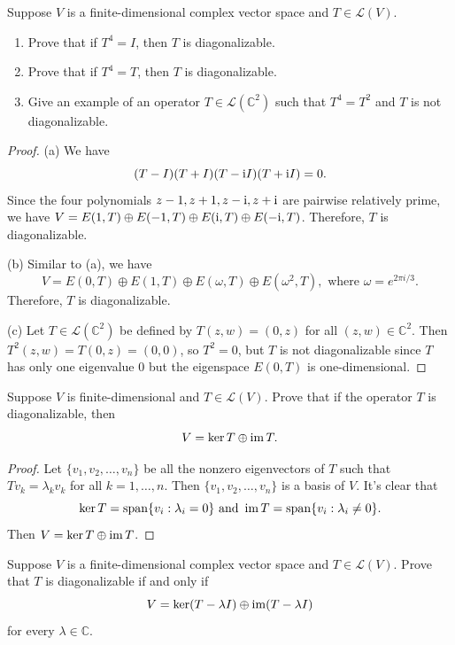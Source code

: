 \documentclass{article}
\begin{document}
\begin{problem}[5D-1]
Suppose $V$ is a finite-dimensional complex vector space and $T \in \mathcal{L}(V)$.
\begin{enumerate}[label=(\alph*)]
\item Prove that if $T^4 = I$, then $T$ is diagonalizable.
\item Prove that if $T^4 = T$, then $T$ is diagonalizable.
\item Give an example of an operator $T \in \mathcal{L}(\mathbb{C}^2)$ such that $T^4 = T^2$ and $T$ is not diagonalizable.
\end{enumerate}
\end{problem}

\begin{proof}
  (a) We have
  \[ (T-I)(T+I)(T-\mathrm{i} I)(T+\mathrm{i} I)=0. \]
  Since the four polynomials \( z-1,z+1,z-\mathrm{i},z+\mathrm{i} \) are pairwise relatively prime, we have \( V = E(1,T)\oplus E(-1,T)\oplus E(\mathrm{i},T)\oplus E(-\mathrm{i},T) \). Therefore, \( T \) is diagonalizable.\par
  (b) Similar to (a), we have
  \[ V=E(0,T)\oplus E(1,T)\oplus E(\omega,T)\oplus E(\omega^2,T),\text{ where } \omega=e^{2\pi i/3}. \]
  Therefore, \( T \) is diagonalizable.\par
  (c) Let \( T \in \mathcal{L}(\mathbb{C}^2) \) be defined by \( T(z,w)=(0,z) \) for all \( (z,w)\in\mathbb{C}^2 \). Then \( T^2(z,w)=T(0,z)=(0,0) \), so \( T^2=0 \), but \( T \) is not diagonalizable since \( T \) has only one eigenvalue \( 0 \) but the eigenspace \( E(0,T) \) is one-dimensional.
\end{proof}



\begin{problem}[5D-3]
Suppose $V$ is finite-dimensional and $T \in \mathcal{L}(V)$. Prove that if the operator $T$ is diagonalizable, then
\[
V = \ker T \oplus \operatorname{im} T.
\]
\end{problem}

\begin{proof}
  Let \( \{v_1,v_2,\dots,v_n\} \) be all the nonzero eigenvectors of \( T \) such that \( Tv_k = \lambda_k v_k \) for all \( k=1,\dots,n \). Then \( \{v_1,v_2,\dots,v_n\} \) is a basis of \( V \). It's clear that
  \[ \ker T=\operatorname{span}\{v_i:\lambda_i=0\} \text{ and } \operatorname{im} T=\operatorname{span}\{v_i:\lambda_i\neq 0\}. \]
  Then \( V= \ker T \oplus \operatorname{im} T \).
\end{proof}



\begin{problem}[5D-5]
Suppose $V$ is a finite-dimensional complex vector space and $T \in \mathcal{L}(V)$. Prove that $T$ is diagonalizable if and only if
\[
V = \ker(T - \lambda I) \oplus \operatorname{im}(T - \lambda I)
\]
for every $\lambda \in \mathbb{C}$.
\end{problem}
\end{document}

